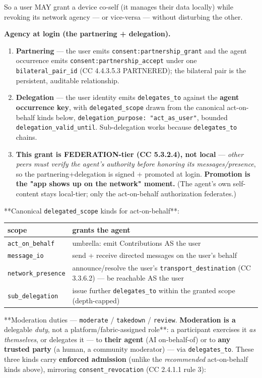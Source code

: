 \documentclass[11pt]{article}
\begin{document}
So a user MAY grant a device co-self (it manages their data locally) while revoking its network agency — or vice-versa — without disturbing the other.


\textbf{Agency at login (the partnering + delegation).}

\begin{enumerate}\setlength\itemsep{0pt}
\item \textbf{Partnering} — the user emits \texttt{consent:partnership\_grant} and the agent occurrence emits \texttt{consent:partnership\_accept} under one \texttt{bilateral\_pair\_id} (CC 4.4.3.5.3 PARTNERED); the bilateral pair is the persistent, auditable relationship.
\item \textbf{Delegation} — the user identity emits \texttt{delegates\_to} against the \textbf{agent occurrence key}, with \texttt{delegated\_scope} drawn from the canonical act-on-behalf kinds below, \texttt{delegation\_purpose: "act\_as\_user"}, bounded \texttt{delegation\_valid\_until}. Sub-delegation works because \texttt{delegates\_to} chains.
\item \textbf{This grant is FEDERATION-tier (CC 5.3.2.4), not local} — \textit{other peers must verify the agent's authority before honoring its messages/presence}, so the partnering+delegation is signed + promoted at login. \textbf{Promotion is the "app shows up on the network" moment.} (The agent's own self-content stays local-tier; only the act-on-behalf authorization federates.)
\end{enumerate}


**Canonical \texttt{delegated\_scope} kinds for act-on-behalf**:


{\footnotesize
\begin{longtable}{|p{8.0cm}|p{8.0cm}|}\hline
\textbf{scope} & \textbf{grants the agent} \\ \hline\endhead
\texttt{act\_on\_behalf} & umbrella: emit Contributions AS the user \\ \hline
\texttt{message\_io} & send + receive directed messages on the user's behalf \\ \hline
\texttt{network\_presence} & announce/resolve the user's \texttt{transport\_destination} (CC 3.3.6.2) — be reachable AS the user \\ \hline
\texttt{sub\_delegation} & issue further \texttt{delegates\_to} within the granted scope (depth-capped) \\ \hline
\end{longtable}}


**Moderation duties — \texttt{moderate} / \texttt{takedown} / \texttt{review}.\textbf{ Moderation is a }delegable \textit{duty}, not a platform/fabric-assigned role**: a participant exercises it \textit{as themselves}, or delegates it — to \textbf{their agent} (AI on-behalf-of) or to \textbf{any trusted party} (a human, a community moderator) — via \texttt{delegates\_to}. These three kinds carry \textbf{enforced admission} (unlike the \textit{recommended} act-on-behalf kinds above), mirroring \texttt{consent\_revocation} (CC 2.4.1.1 rule 3):
\end{document}
